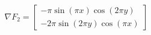 $$
\nabla F_2 = \left[\begin{matrix}- \pi \sin{\left(\pi x \right)} \cos{\left(2 \pi y \right)}\\- 2 \pi \sin{\left(2 \pi y \right)} \cos{\left(\pi x \right)}\end{matrix}\right]
$$
